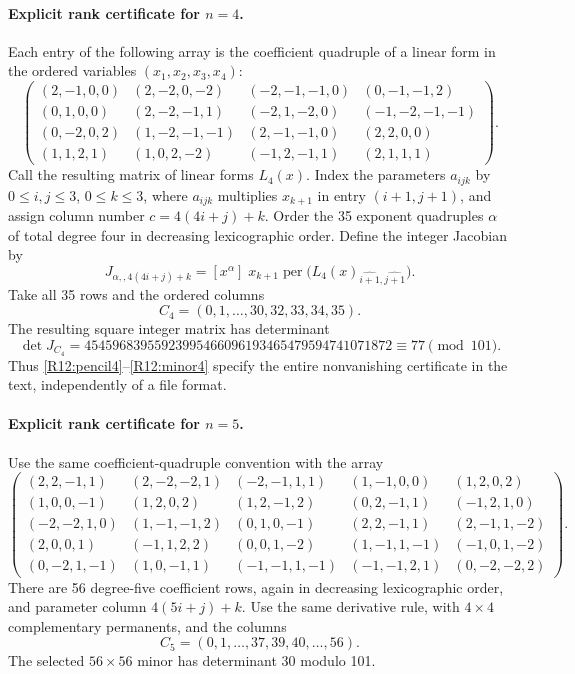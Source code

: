\documentclass[11pt,a4paper]{article}
\theoremstyle{definition}\newtheorem{definition}{Definition}
\begin{document}
\paragraph{Explicit rank certificate for $n=4$.}
Each entry of the following array is the coefficient quadruple of
a linear form in the ordered variables $(x_1,x_2,x_3,x_4)$:
\begin{equation}\label{R12:pencil4}
\begin{pmatrix}
(2,-1,0,0)&(2,-2,0,-2)&(-2,-1,-1,0)&(0,-1,-1,2)\\
(0,1,0,0)&(2,-2,-1,1)&(-2,1,-2,0)&(-1,-2,-1,-1)\\
(0,-2,0,2)&(1,-2,-1,-1)&(2,-1,-1,0)&(2,2,0,0)\\
(1,1,2,1)&(1,0,2,-2)&(-1,2,-1,1)&(2,1,1,1)
\end{pmatrix}.
\end{equation}
Call the resulting matrix of linear forms $L_4(x)$. Index the
parameters $a_{ijk}$ by $0\leq i,j\leq3$, $0\leq k\leq3$,
where $a_{ijk}$ multiplies $x_{k+1}$ in entry $(i+1,j+1)$,
and assign column number $c=4(4i+j)+k$.
Order the 35 exponent quadruples $\alpha$ of total degree four in
decreasing lexicographic order. Define the integer Jacobian by
\begin{equation}\label{R12:derivative}
 J_{\alpha,,4(4i+j)+k}
 =[x^\alpha]\;x_{k+1}
 \operatorname{per}\bigl(L_4(x)_{\widehat{i+1},\widehat{j+1}}\bigr).
\end{equation}
Take all 35 rows and the ordered columns
\[
 C_4=(0,1,\ldots,30,32,33,34,35).
\]
The resulting square integer matrix has determinant
\begin{equation}\label{R12:minor4}
 \det J_{C_4}
 =45459683955923995466096193465479594741071872
 \equiv77\pmod{101}.
\end{equation}
Thus \eqref{R12:pencil4}--\eqref{R12:minor4} specify the entire
nonvanishing certificate in the text, independently of a file format.

\paragraph{Explicit rank certificate for $n=5$.}
Use the same coefficient-quadruple convention with the array
\begin{equation}\label{R12:pencil5}
\begin{pmatrix}
(2,2,-1,1)&(2,-2,-2,1)&(-2,-1,1,1)&(1,-1,0,0)&(1,2,0,2)\\
(1,0,0,-1)&(1,2,0,2)&(1,2,-1,2)&(0,2,-1,1)&(-1,2,1,0)\\
(-2,-2,1,0)&(1,-1,-1,2)&(0,1,0,-1)&(2,2,-1,1)&(2,-1,1,-2)\\
(2,0,0,1)&(-1,1,2,2)&(0,0,1,-2)&(1,-1,1,-1)&(-1,0,1,-2)\\
(0,-2,1,-1)&(1,0,-1,1)&(-1,-1,1,-1)&(-1,-1,2,1)&(0,-2,-2,2)
\end{pmatrix}.
\end{equation}
There are 56 degree-five coefficient rows, again in decreasing
lexicographic order, and parameter column $4(5i+j)+k$.
Use the same derivative rule, with $4\times4$ complementary
permanents, and the columns
\[
 C_5=(0,1,\ldots,37,39,40,\ldots,56).
\]
The selected $56\times56$ minor has determinant $30$ modulo 101.
\end{document}
